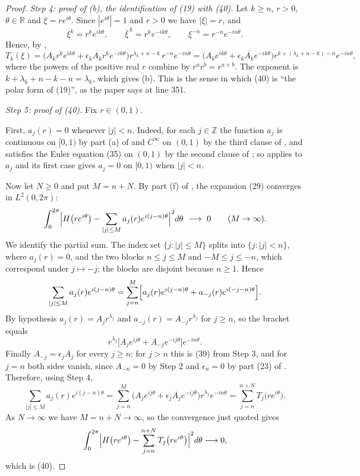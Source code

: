 \begin{proof}
\emph{Step 4: proof of (b), the identification of (19) with (40).}  Let
$k\ge n$, $r>0$, $\theta\in\mathbb{R}$ and $\xi=re^{i\theta}$.  Since
$|e^{i\theta}|=1$ and $r>0$ we have $|\xi|=r$, and
\[
  \xi^k=r^ke^{ik\theta},\qquad \bar\xi^{\,k}=r^ke^{-ik\theta},\qquad
  \xi^{-n}=r^{-n}e^{-in\theta}.
\]
Hence, by ,
\[
  T_k(\xi)=\bigl(A_kr^ke^{ik\theta}+\epsilon_k\overline{A_k}r^ke^{-ik\theta}\bigr)
    r^{\lambda_k+n-k}\,r^{-n}e^{-in\theta}
  =\bigl(A_ke^{ik\theta}+\epsilon_k\overline{A_k}e^{-ik\theta}\bigr)
    r^{k+(\lambda_k+n-k)-n}e^{-in\theta},
\]
where the powers of the positive real $r$ combine by $r^ar^b=r^{a+b}$.  The
exponent is $k+\lambda_k+n-k-n=\lambda_k$, which gives (b).  This is the sense
in which (40) is ``the polar form of (19)'', as the paper says at line 351.

\emph{Step 5: proof of (40).}  Fix $r\in(0,1)$.

First, $a_j(r)=0$ whenever $|j|<n$.  Indeed, for each $j\in\mathbb{Z}$ the
function $a_j$ is continuous on $[0,1)$ by part (a) of
 and $C^\infty$ on $(0,1)$ by the third clause
of , and satisfies the Euler equation (35) on $(0,1)$
by the second clause of ; so 
applies to $a_j$ and its first case gives $a_j=0$ on $[0,1)$ when $|j|<n$.

Now let $N\ge0$ and put $M=n+N$.  By part (f) of
, the expansion (29) converges in
$L^2(0,2\pi)$:
\[
  \int_0^{2\pi}\Bigl|H\bigl(re^{i\theta}\bigr)
    -\sum_{|j|\le M}a_j(r)e^{i(j-n)\theta}\Bigr|^2d\theta\ \longrightarrow\ 0
  \qquad(M\to\infty).
\]
We identify the partial sum.  The index set $\{j:|j|\le M\}$ splits into
$\{j:|j|<n\}$, where $a_j(r)=0$, and the two blocks $n\le j\le M$ and
$-M\le j\le -n$, which correspond under $j\mapsto-j$; the blocks are disjoint
because $n\ge1$.  Hence
\[
  \sum_{|j|\le M}a_j(r)e^{i(j-n)\theta}
  =\sum_{j=n}^{M}\Bigl[a_j(r)e^{i(j-n)\theta}+a_{-j}(r)e^{i(-j-n)\theta}\Bigr].
\]
By hypothesis $a_j(r)=A_jr^{\lambda_j}$ and $a_{-j}(r)=A_{-j}r^{\lambda_j}$ for
$j\ge n$, so the bracket equals
\[
  r^{\lambda_j}\bigl[A_je^{ij\theta}+A_{-j}e^{-ij\theta}\bigr]e^{-in\theta}.
\]
Finally $A_{-j}=\epsilon_j\overline{A_j}$ for every $j\ge n$: for $j>n$ this is
(39) from Step 3, and for $j=n$ both sides vanish, since $A_{-n}=0$ by Step 2
and $\epsilon_n=0$ by part (23) of .  Therefore,
using Step 4,
\[
  \sum_{|j|\le M}a_j(r)e^{i(j-n)\theta}
  =\sum_{j=n}^{M}\bigl(A_je^{ij\theta}+\epsilon_j\overline{A_j}e^{-ij\theta}\bigr)
    r^{\lambda_j}e^{-in\theta}
  =\sum_{j=n}^{n+N}T_j\bigl(re^{i\theta}\bigr).
\]
As $N\to\infty$ we have $M=n+N\to\infty$, so the convergence just quoted gives
\[
  \int_0^{2\pi}\Bigl|H\bigl(re^{i\theta}\bigr)
    -\sum_{j=n}^{n+N}T_j\bigl(re^{i\theta}\bigr)\Bigr|^2d\theta\longrightarrow0,
\]
which is (40).
\end{proof}
